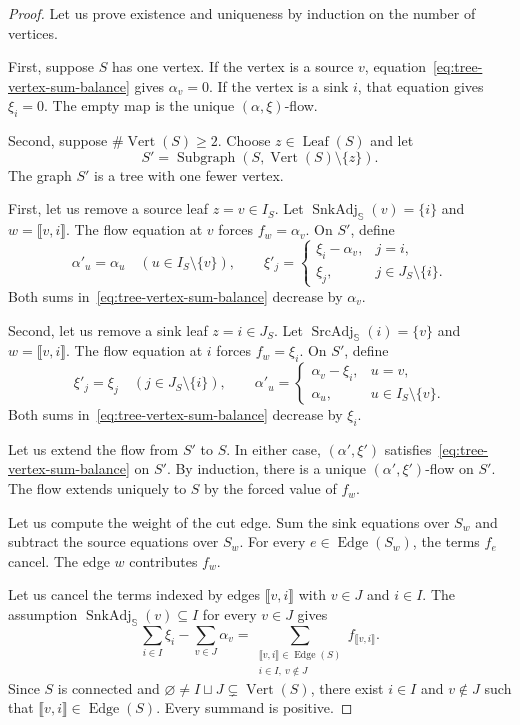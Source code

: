 \begin{proof}
 Let us prove existence and uniqueness by induction on the number of vertices.

First, suppose $S$ has one vertex. If the vertex is a source $v$, equation~\eqref{eq:tree-vertex-sum-balance} gives $\alpha_v=0$.
If the vertex is a sink $i$, that equation gives $\xi_i=0$.
The empty map is the unique $(\alpha,\xi)$-flow.

Second, suppose $\#\operatorname{Vert}(S)\ge2$. Choose $z\in\operatorname{Leaf}(S)$ and let
\[
 S'=\operatorname{Subgraph}(S,\operatorname{Vert}(S)\setminus\{z\}).
\]
The graph $S'$ is a tree with one fewer vertex.

First, let us remove a source leaf $z=v\in I_S$. Let $\operatorname{SnkAdj}_{\mathbb S}(v)=\{i\}$ and $w=\llbracket v,i\rrbracket$.
The flow equation at $v$ forces $f_w=\alpha_v$.
On $S'$, define
\[
 \alpha'_u=\alpha_u\quad(u\in I_S\setminus\{v\}),\qquad
 \xi'_j=\begin{cases}\xi_i-\alpha_v,&j=i,\\\xi_j,&j\in J_S\setminus\{i\}.\end{cases}
\]
Both sums in~\eqref{eq:tree-vertex-sum-balance} decrease by $\alpha_v$.

Second, let us remove a sink leaf $z=i\in J_S$. Let $\operatorname{SrcAdj}_{\mathbb S}(i)=\{v\}$ and $w=\llbracket v,i\rrbracket$.
The flow equation at $i$ forces $f_w=\xi_i$.
On $S'$, define
\[
 \xi'_j=\xi_j\quad(j\in J_S\setminus\{i\}),\qquad
 \alpha'_u=\begin{cases}\alpha_v-\xi_i,&u=v,\\\alpha_u,&u\in I_S\setminus\{v\}.\end{cases}
\]
Both sums in~\eqref{eq:tree-vertex-sum-balance} decrease by $\xi_i$.

Let us extend the flow from $S'$ to $S$.
In either case, $(\alpha',\xi')$ satisfies~\eqref{eq:tree-vertex-sum-balance} on $S'$.
By induction, there is a unique $(\alpha',\xi')$-flow on $S'$.
The flow extends uniquely to $S$ by the forced value of $f_w$.

 Let us compute the weight of the cut edge. Sum the sink equations over $S_w$ and subtract the source equations over $S_w$.
For every $e\in\operatorname{Edge}(S_w)$, the terms $f_e$ cancel. The edge $w$ contributes $f_w$.

 Let us cancel the terms indexed by edges $\llbracket v,i\rrbracket$ with $v\in J$ and $i\in I$.
The assumption $\operatorname{SnkAdj}_{\mathbb S}(v)\subseteq I$ for every $v\in J$ gives
\[
 \sum_{i\in I}\xi_i-\sum_{v\in J}\alpha_v
 =\sum_{\substack{\llbracket v,i\rrbracket\in\operatorname{Edge}(S)\\
                  i\in I,\ v\notin J}}f_{\llbracket v,i\rrbracket}.
\]
Since $S$ is connected and $\varnothing\ne I\sqcup J\subsetneq\operatorname{Vert}(S)$,
there exist $i\in I$ and $v\notin J$ such that $\llbracket v,i\rrbracket\in\operatorname{Edge}(S)$.
Every summand is positive.
\end{proof}

